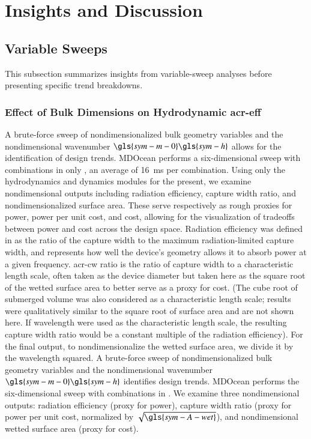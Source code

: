 \section{Insights and Discussion}
\label{sec:discussion}

\subsection{Variable Sweeps}
This subsection summarizes insights from variable-sweep analyses before presenting specific trend breakdowns.

\subsubsection{Effect of Bulk Dimensions on Hydrodynamic \gls{acr-eff}}
\ifdefined\DISSERTATION
    A brute-force sweep of nondimensionalized bulk geometry variables and the nondimensional wavenumber $\gls{sym-m-0}\gls{sym-h}$ allows for the identification of design trends.
    MDOcean performs a six-dimensional sweep with \resultsAOR[meemSweepSize] combinations in only \resultsAOR[meemSweepTime], an average of 16~ms per combination.
    Using only the hydrodynamics and dynamics modules for the present, we examine nondimensional outputs including radiation efficiency, capture width ratio, and nondimensionalized surface area.
    These serve respectively as rough proxies for power, power per unit cost, and cost, allowing for the visualization of tradeoffs between power and cost across the design space.
    Radiation efficiency was defined in  as the ratio of the capture width to the maximum radiation-limited capture width, and represents how well the device's geometry allows it to absorb power at a given frequency.
    \gls{acr-cw} ratio is the ratio of capture width to a characteristic length scale, often taken as the device diameter but taken here as the square root of the wetted surface area to better serve as a proxy for cost.
    (The cube root of submerged volume was also considered as a characteristic length scale; results were qualitatively similar to the square root of surface area and are not shown here.
    If wavelength were used as the characteristic length scale, the resulting capture width ratio would be a constant multiple of the radiation efficiency).
    For the final output, to nondimensionalize the wetted surface area, we divide it by the wavelength squared.
\else
    A brute-force sweep of nondimensionalized bulk geometry variables and the nondimensional wavenumber $\gls{sym-m-0}\gls{sym-h}$ identifies design trends.
    MDOcean performs the six-dimensional sweep with \resultsAOR[meemSweepSize] combinations in \resultsAOR[meemSweepTime].
    We examine three nondimensional outputs: radiation efficiency (proxy for power), capture width ratio (proxy for power per unit cost, normalized by $\sqrt{\gls{sym-A-wet}}$), and nondimensional wetted surface area (proxy for cost).
\fi

